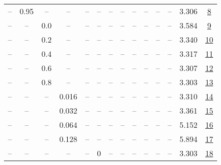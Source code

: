 \begin{table}[H]
\begin{tabular}{cccccccccccccc}
-- & 0.95 & -- & -- & -- & -- & -- & -- & -- & -- & -- & -- & 3.306 & \href{https://wandb.ai/stanford-mercury/optimizer-scaling/runs/sweep-130m-10B-sciond34ea1lr0.008-wd0.1-minlr0-warmup0-b10.95-gn-2dd73c}{8} \\
-- & -- & 0.0 & -- & -- & -- & -- & -- & -- & -- & -- & -- & 3.584 & \href{https://wandb.ai/stanford-mercury/optimizer-scaling/runs/sweep-130m-10B-scion1be043lr0.008-wd0.1-minlr0-warmup0-b10.98-gn-629a0b}{9} \\
-- & -- & 0.2 & -- & -- & -- & -- & -- & -- & -- & -- & -- & 3.340 & \href{https://wandb.ai/stanford-mercury/optimizer-scaling/runs/sweep-130m-10B-scionff2a74lr0.008-wd0.1-minlr0-warmup0-b10.98-gn-70dbae}{10} \\
-- & -- & 0.4 & -- & -- & -- & -- & -- & -- & -- & -- & -- & 3.317 & \href{https://wandb.ai/stanford-mercury/optimizer-scaling/runs/sweep-130m-10B-scion93c728lr0.008-wd0.1-minlr0-warmup0-b10.98-gn-0b64cb}{11} \\
-- & -- & 0.6 & -- & -- & -- & -- & -- & -- & -- & -- & -- & 3.307 & \href{https://wandb.ai/stanford-mercury/optimizer-scaling/runs/sweep-130m-10B-scion232c0flr0.008-wd0.1-minlr0-warmup0-b10.98-gn-beec93}{12} \\
-- & -- & 0.8 & -- & -- & -- & -- & -- & -- & -- & -- & -- & 3.303 & \href{https://wandb.ai/stanford-mercury/optimizer-scaling/runs/sweep-130m-10B-scion2554c3lr0.008-wd0.1-minlr0-warmup0-b10.98-gn-0ecfe4}{13} \\
-- & -- & -- & 0.016 & -- & -- & -- & -- & -- & -- & -- & -- & 3.310 & \href{https://wandb.ai/stanford-mercury/optimizer-scaling/runs/sweep-130m-10B-scion7f272clr0.016-wd0.1-minlr0-warmup0-b10.98-gn-dfad11}{14} \\
-- & -- & -- & 0.032 & -- & -- & -- & -- & -- & -- & -- & -- & 3.361 & \href{https://wandb.ai/stanford-mercury/optimizer-scaling/runs/sweep-130m-10B-scion2cfd93lr0.032-wd0.1-minlr0-warmup0-b10.98-gn-1524ed}{15} \\
-- & -- & -- & 0.064 & -- & -- & -- & -- & -- & -- & -- & -- & 5.152 & \href{https://wandb.ai/stanford-mercury/optimizer-scaling/runs/sweep-130m-10B-scion39d76blr0.064-wd0.1-minlr0-warmup0-b10.98-gn-b75bde}{16} \\
-- & -- & -- & 0.128 & -- & -- & -- & -- & -- & -- & -- & -- & 5.894 & \href{https://wandb.ai/stanford-mercury/optimizer-scaling/runs/sweep-130m-10B-scionadd481lr0.128-wd0.1-minlr0-warmup0-b10.98-gn-7dc1e1}{17} \\
-- & -- & -- & -- & -- & 0 & -- & -- & -- & -- & -- & -- & 3.303 & \href{https://wandb.ai/stanford-mercury/optimizer-scaling/runs/sweep-130m-10B-scion6f1ab7lr0.008-wd0.1-minlr0-warmup0-b10.98-gn-f7db0a}{18} \\

\end{tabular}
\end{table}
